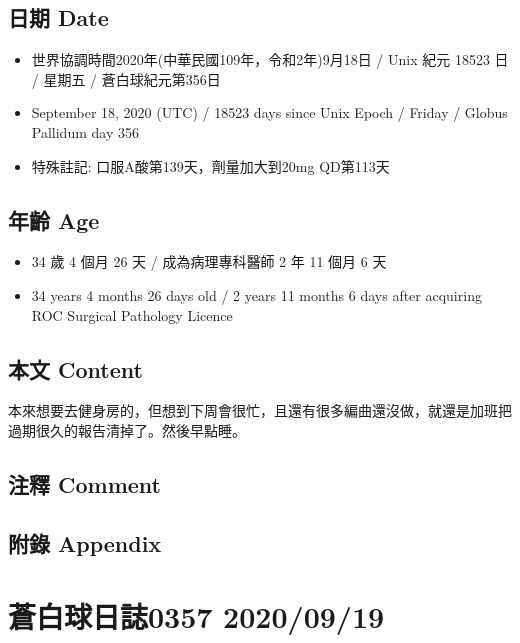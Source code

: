 \documentclass[a5paper, 11pt
]{book}
\providecommand{\tightlist}{%
  \setlength{\itemsep}{0pt}\setlength{\parskip}{0pt}}
\begin{document}
\hypertarget{ux65e5ux671f-date-17}{%
\subsection{日期 Date}\label{ux65e5ux671f-date-17}}

\begin{itemize}
\tightlist
\item
  世界協調時間2020年(中華民國109年，令和2年)9月18日 / Unix 紀元 18523 日
  / 星期五 / 蒼白球紀元第356日
\item
  September 18, 2020 (UTC) / 18523 days since Unix Epoch / Friday /
  Globus Pallidum day 356
\item
  特殊註記: 口服A酸第139天，劑量加大到20mg QD第113天
\end{itemize}

\hypertarget{ux5e74ux9f61-age-17}{%
\subsection{年齡 Age}\label{ux5e74ux9f61-age-17}}

\begin{itemize}
\tightlist
\item
  34 歲 4 個月 26 天 / 成為病理專科醫師 2 年 11 個月 6 天
\item
  34 years 4 months 26 days old / 2 years 11 months 6 days after
  acquiring ROC Surgical Pathology Licence
\end{itemize}

\hypertarget{ux672cux6587-content-17}{%
\subsection{本文 Content}\label{ux672cux6587-content-17}}

本來想要去健身房的，但想到下周會很忙，且還有很多編曲還沒做，就還是加班把過期很久的報告清掉了。然後早點睡。

\hypertarget{ux6ce8ux91cb-comment-17}{%
\subsection{注釋 Comment}\label{ux6ce8ux91cb-comment-17}}

\hypertarget{ux9644ux9304-appendix-17}{%
\subsection{附錄 Appendix}\label{ux9644ux9304-appendix-17}}

\hypertarget{ux84bcux767dux7403ux65e5ux8a8c0357-20200919}{%
\section{蒼白球日誌0357
2020/09/19}\label{ux84bcux767dux7403ux65e5ux8a8c0357-20200919}}
\end{document}

